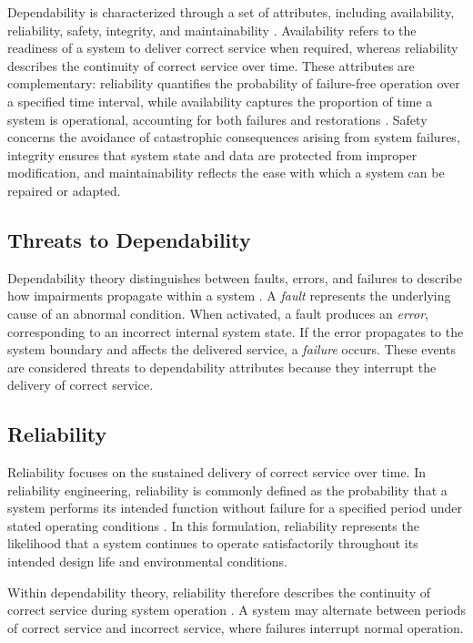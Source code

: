 Dependability is characterized through a set of attributes, including availability, reliability, safety, integrity, and maintainability \cite{avizienis2004basic}. Availability refers to the readiness of a system to deliver correct service when required, whereas reliability describes the continuity of correct service over time. These attributes are complementary: reliability quantifies the probability of failure-free operation over a specified time interval, while availability captures the proportion of time a system is operational, accounting for both failures and restorations \cite{laprie1985dependable}. Safety concerns the avoidance of catastrophic consequences arising from system failures, integrity ensures that system state and data are protected from improper modification, and maintainability reflects the ease with which a system can be repaired or adapted.

\subsection{Threats to Dependability}

Dependability theory distinguishes between faults, errors, and failures to describe how impairments propagate within a system \cite{avizienis2004basic}. A \textit{fault} represents the underlying cause of an abnormal condition. When activated, a fault produces an \textit{error}, corresponding to an incorrect internal system state. If the error propagates to the system boundary and affects the delivered service, a \textit{failure} occurs. These events are considered threats to dependability attributes because they interrupt the delivery of correct service.

\subsection{Reliability}

Reliability focuses on the sustained delivery of correct service over time. In reliability engineering, reliability is commonly defined as the probability that a system performs its intended function without failure for a specified period under stated operating conditions \cite{ram2013system, alma991032896202207371}. In this formulation, reliability represents the likelihood that a system continues to operate satisfactorily throughout its intended design life and environmental conditions.

Within dependability theory, reliability therefore describes the continuity of correct service during system operation \cite{laprie1996software,avizienis2004basic}. A system may alternate between periods of correct service and incorrect service, where failures interrupt normal operation.

